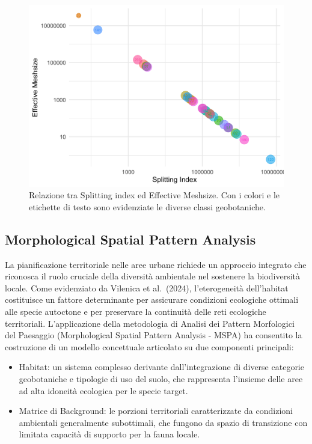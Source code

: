 \documentclass[
  a4paper,
]{book}
\begin{document}
\begin{figure}
\includegraphics[width=\linewidth]{./figs/plotSE} \caption{Relazione tra Splitting index ed Effective Meshsize. Con i colori e le etichette di testo sono evidenziate le diverse classi geobotaniche.}\label{fig:plotSE}
\end{figure}

\subsection{Morphological Spatial Pattern Analysis}\label{morphological-spatial-pattern-analysis-1}

La pianificazione territoriale nelle aree urbane richiede un approccio integrato che riconosca il ruolo cruciale della diversità ambientale nel sostenere la biodiversità locale.
Come evidenziato da Vilenica et al.~(2024), l'eterogeneità dell'habitat costituisce un fattore determinante per assicurare condizioni ecologiche ottimali alle specie autoctone e per preservare la continuità delle reti ecologiche territoriali.
L'applicazione della metodologia di Analisi dei Pattern Morfologici del Paesaggio (Morphological Spatial Pattern Analysis - MSPA) ha consentito la costruzione di un modello concettuale articolato su due componenti principali:

\begin{itemize}
\item
  Habitat: un sistema complesso derivante dall'integrazione di diverse categorie geobotaniche e tipologie di uso del suolo, che rappresenta l'insieme delle aree ad alta idoneità ecologica per le specie target.
\item
  Matrice di Background: le porzioni territoriali caratterizzate da condizioni ambientali generalmente subottimali, che fungono da spazio di transizione con limitata capacità di supporto per la fauna locale.
\end{itemize}
\end{document}
